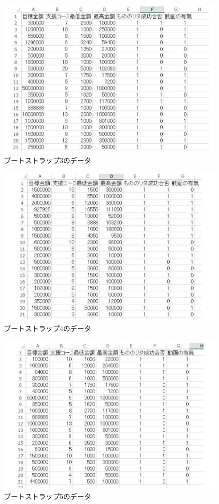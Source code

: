 \begin{figure}[H]
\centering
\includegraphics[width=13cm]{figure43.pdf}
\caption{ブートストラップ3のデータ}\label{sannp}
\end{figure}

\begin{figure}[H]
\centering
\includegraphics[width=13cm]{figure50.pdf}
\caption{ブートストラップ4のデータ}\label{sannp}
\end{figure}

\begin{figure}[H]
\centering
\includegraphics[width=13cm]{figure51.pdf}
\caption{ブートストラップ5のデータ}\label{sannp}
\end{figure}

